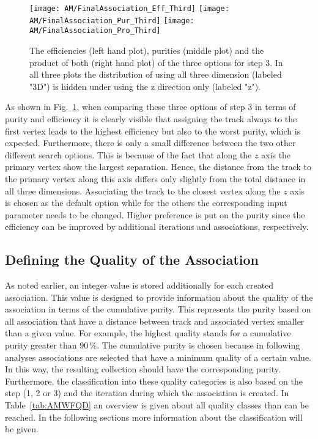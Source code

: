 \begin{figure}[!ht]
    \centering
    \texttt{[image: AM/FinalAssociation\_Eff\_Third]}
    \texttt{[image: AM/FinalAssociation\_Pur\_Third]}
    \texttt{[image: AM/FinalAssociation\_Pro\_Third]}
    \caption[Efficiencies, purities and their product of the three options of step 3]{The efficiencies (left hand plot), purities (middle plot) and the product of both (right hand plot) of the three options for step 3. In all three plots the distribution of using all three dimension (labeled "3D") is hidden under using the z direction only (labeled "z"). \label{plot:AMWFFA}}
\end{figure}

As shown in Fig.~\ref{plot:AMWFFA}, when comparing these three options of step 3 in terms of purity and efficiency it is clearly visible that assigning the track always to the first vertex leads to the highest efficiency but also to the worst purity, which is expected. Furthermore, there is only a small difference between the two other different search options. This is because of the fact that along the $z$ axis the primary vertex show the largest separation. Hence, the distance from the track to the primary vertex along this axis differs only slightly from the total distance in all three dimensions. Associating the track to the closest vertex along the $z$ axis is chosen as the default option while for the others the corresponding input parameter needs to be changed. Higher preference is put on the purity since the efficiency can be improved by additional iterations and associations, respectively.


\subsection{Defining the Quality of the Association\label{sec:AMWFQD}}

As noted earlier, an integer value is stored additionally for each created association. This value is designed to provide information about the quality of the association in terms of the cumulative purity. This represents the purity based on all association that have a distance between track and associated vertex smaller than a given value. For example, the highest quality stands for a cumulative purity greater than $90\,\%$. The cumulative purity is chosen because in following analyses associations are selected that have a minimum quality of a certain value. In this way, the resulting collection should have the corresponding purity.  Furthermore, the classification into these quality categories is also based on the step (1, 2 or 3) and the iteration during which the association is created. In Table~\ref{tab:AMWFQD} an overview is given about all quality classes than can be reached. In the following sections more information about the classification will be given.

